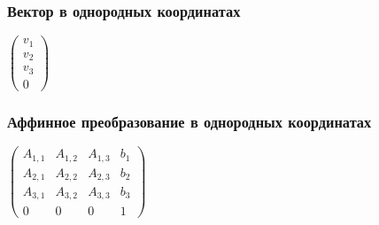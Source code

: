 \documentclass[10pt]{beamer}
\begin{document}
\begin{frame}[fragile]
\frametitle{Вектор в однородных координатах}
\begin{center}
\begin{math}
\begin{pmatrix}
v_1 \\
v_2 \\
v_3 \\
0
\end{pmatrix}
\end{math}
\end{center}
\end{frame}

\begin{frame}[fragile]
\frametitle{Аффинное преобразование в однородных координатах}
\begin{center}
\begin{math}
\begin{pmatrix}
A_{1,1} & A_{1,2} & A_{1,3} & b_1 \\
A_{2,1} & A_{2,2} & A_{2,3} & b_2 \\
A_{3,1} & A_{3,2} & A_{3,3} & b_3 \\
0 & 0 & 0 & 1
\end{pmatrix}
\end{math}
\end{center}
\end{frame}
\end{document}
